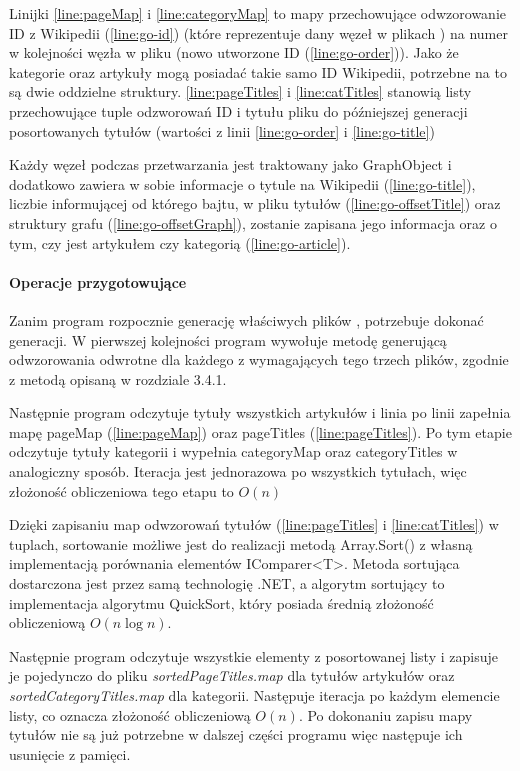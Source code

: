 Linijki \ref{line:pageMap} i \ref{line:categoryMap} to mapy przechowujące odwzorowanie ID z Wikipedii (\ref{line:go-id}) (które reprezentuje dany węzeł w plikach ) na numer w kolejności węzła w pliku  (nowo utworzone ID (\ref{line:go-order})). Jako że kategorie oraz artykuły mogą posiadać takie samo ID Wikipedii, potrzebne na to są dwie oddzielne struktury. \ref{line:pageTitles} i \ref{line:catTitles} stanowią listy przechowujące tuple odzworowań ID i tytułu pliku do późniejszej generacji posortowanych tytułów (wartości z linii \ref{line:go-order} i \ref{line:go-title})

Każdy węzeł podczas przetwarzania jest traktowany jako GraphObject i dodatkowo zawiera w sobie informacje o tytule na Wikipedii (\ref{line:go-title}), liczbie informującej od którego bajtu, w pliku tytułów  (\ref{line:go-offsetTitle}) oraz struktury grafu  (\ref{line:go-offsetGraph}), zostanie zapisana jego informacja oraz o tym, czy jest artykułem czy kategorią (\ref{line:go-article}).

\paragraph{Operacje przygotowujące}
Zanim program rozpocznie generację właściwych plików , potrzebuje dokonać generacji. W pierwszej kolejności program wywołuje metodę generującą odwzorowania odwrotne dla każdego z wymagających tego trzech plików, zgodnie z metodą opisaną w rozdziale 3.4.1.

Następnie program odczytuje tytuły wszystkich artykułów i linia po linii zapełnia mapę pageMap (\ref{line:pageMap}) oraz pageTitles (\ref{line:pageTitles}). Po tym etapie odczytuje tytuły kategorii i wypełnia categoryMap oraz categoryTitles w analogiczny sposób. Iteracja jest jednorazowa po wszystkich tytułach, więc złożoność obliczeniowa tego etapu to $O(n)$

Dzięki zapisaniu map odwzorowań tytułów (\ref{line:pageTitles} i \ref{line:catTitles}) w tuplach, sortowanie możliwe jest do realizacji metodą Array.Sort() z własną implementacją porównania elementów IComparer<T>. Metoda sortująca dostarczona jest przez samą technologię .NET, a algorytm sortujący to implementacja algorytmu QuickSort, który posiada średnią złożoność obliczeniową $O(n\log n)$.

Następnie program odczytuje wszystkie elementy z posortowanej listy i zapisuje je pojedynczo do pliku \textit{sortedPageTitles.map} dla tytułów artykułów oraz \textit{sortedCategoryTitles.map} dla kategorii. Następuje iteracja po każdym elemencie listy, co oznacza złożoność obliczeniową $O(n)$. Po dokonaniu zapisu mapy tytułów nie są już potrzebne w dalszej części programu więc następuje ich usunięcie z pamięci.

